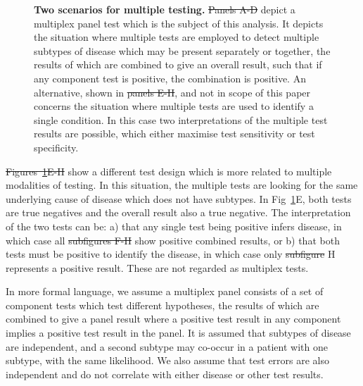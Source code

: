 \documentclass[10pt,letterpaper]{article}
\providecommand{\DIFaddtex}[1]{{\protect\color{blue}\uwave{#1}}} %
\providecommand{\DIFdeltex}[1]{{\protect\color{red}\sout{#1}}}                      %
\providecommand{\DIFaddbegin}{} %
\providecommand{\DIFaddend}{} %
\providecommand{\DIFdelbegin}{} %
\providecommand{\DIFdelend}{} %
\providecommand{\DIFaddFL}[1]{\DIFadd{#1}} %
\providecommand{\DIFdelFL}[1]{\DIFdel{#1}} %
\providecommand{\DIFaddbeginFL}{} %
\providecommand{\DIFaddendFL}{} %
\providecommand{\DIFdelbeginFL}{} %
\providecommand{\DIFdelendFL}{} %
\providecommand{\DIFadd}[1]{\texorpdfstring{\DIFaddtex{#1}}{#1}} %
\providecommand{\DIFdel}[1]{\texorpdfstring{\DIFdeltex{#1}}{}} %
\newcommand{\DIFscaledelfig}{0.5}
\newlength{\DIFdelgraphicswidth} %
\newlength{\DIFdelgraphicsheight} %
\newcommand{\DIFaddincludegraphics}[2][]{{\color{blue}\fbox{\DIFOincludegraphics[#1]{#2}}}} %
\newcommand{\DIFdelincludegraphics}[2][]{%
\sbox{\DIFdelgraphicsbox}{\DIFOincludegraphics[#1]{#2}}%
\settoboxwidth{\DIFdelgraphicswidth}{\DIFdelgraphicsbox} %
\settoboxtotalheight{\DIFdelgraphicsheight}{\DIFdelgraphicsbox} %
\scalebox{\DIFscaledelfig}{%
\parbox[b]{\DIFdelgraphicswidth}{\usebox{\DIFdelgraphicsbox}\\[-\baselineskip] \rule{\DIFdelgraphicswidth}{0em}}\llap{\resizebox{\DIFdelgraphicswidth}{\DIFdelgraphicsheight}{%
\setlength{\unitlength}{\DIFdelgraphicswidth}%
\begin{picture}(1,1)%
\thicklines\linethickness{2pt} %
{\color[rgb]{1,0,0}\put(0,0){\framebox(1,1){}}}%
{\color[rgb]{1,0,0}\put(0,0){\line( 1,1){1}}}%
{\color[rgb]{1,0,0}\put(0,1){\line(1,-1){1}}}%
\end{picture}%
}\hspace*{3pt}}} %
} %
\DeclareRobustCommand{\DIFaddbegin}{\DIFOaddbegin \let\includegraphics\DIFaddincludegraphics} %
\DeclareRobustCommand{\DIFaddend}{\DIFOaddend \let\includegraphics\DIFOincludegraphics} %
\DeclareRobustCommand{\DIFdelbegin}{\DIFOdelbegin \let\includegraphics\DIFdelincludegraphics} %
\DeclareRobustCommand{\DIFdelend}{\DIFOaddend \let\includegraphics\DIFOincludegraphics} %
\DeclareRobustCommand{\DIFaddbeginFL}{\DIFOaddbeginFL \let\includegraphics\DIFaddincludegraphics} %
\DeclareRobustCommand{\DIFaddendFL}{\DIFOaddendFL \let\includegraphics\DIFOincludegraphics} %
\DeclareRobustCommand{\DIFdelbeginFL}{\DIFOdelbeginFL \let\includegraphics\DIFdelincludegraphics} %
\DeclareRobustCommand{\DIFdelendFL}{\DIFOaddendFL \let\includegraphics\DIFOincludegraphics} %
\begin{document}
\begin{figure}[!ht]
\caption{{\bf Two scenarios for multiple testing.}
\DIFdelbeginFL \DIFdelFL{Panels A-D }\DIFdelendFL \DIFaddbeginFL \DIFaddFL{Figs~\ref{fig1}A-\ref{fig1}D }\DIFaddendFL depict a multiplex panel test which is the subject of this analysis. It depicts the situation where multiple tests are employed to detect multiple subtypes of disease which may be present separately or together, the results of which are combined to give an overall result, such that if any component test is positive, the combination is positive. An alternative, shown in \DIFdelbeginFL \DIFdelFL{panels E-H}\DIFdelendFL \DIFaddbeginFL \DIFaddFL{Figs~\ref{fig1}E-\ref{fig1}H}\DIFaddendFL , and not in scope of this paper concerns the situation where multiple tests are used to identify a single condition. In this case two interpretations of the multiple test results are possible, which either maximise test sensitivity or test specificity.}
\label{fig1}
\end{figure}

\DIFdelbegin \DIFdel{Figures~\ref{fig1}E-H }\DIFdelend \DIFaddbegin \DIFadd{Fig~\ref{fig1}E-\ref{fig1}H }\DIFaddend show a different test design which is more related to multiple modalities of testing\cite{weinstein2005}. In this situation, the multiple tests are looking for the same underlying cause of disease which does not have subtypes. In Fig~\ref{fig1}E, both tests are true negatives and the overall result also a true negative. The interpretation of the two tests can be: a) that any single test being positive infers disease, in which case all \DIFdelbegin \DIFdel{subfigures F-H }\DIFdelend \DIFaddbegin \DIFadd{Figs~\ref{fig1}F-\ref{fig1}H }\DIFaddend show positive combined results, or b) that both tests must be positive to identify the disease, in which case only \DIFdelbegin \DIFdel{subfigure }\DIFdelend \DIFaddbegin \DIFadd{Fig~\ref{fig1}}\DIFaddend H represents a positive result. These are not regarded as multiplex tests.

In more formal language, we assume a multiplex panel consists of a set of component tests which test different hypotheses, the results of which are combined to give a panel result where a positive test result in any component implies a positive test result in the panel. It is assumed that subtypes of disease are independent, and a second subtype may co-occur in a patient with one subtype, with the same likelihood. We also assume that test errors are also independent and do not correlate with either disease or other test results.
\end{document}
